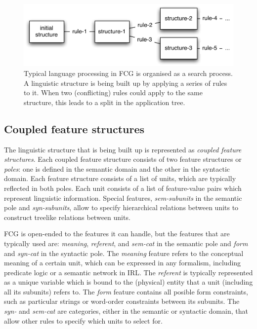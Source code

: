 \begin{figure}
  \begin{center}
    \includegraphics[width=.75\textwidth]{./frameworks/figures/fcg-search.pdf}
    \caption[Application of a rule-set]{Typical language processing in
      FCG is organised as a search process. A linguistic structure is
      being built up by applying a series of rules to it. When two
      (conflicting) rules could apply to the same structure, this
      leads to a split in the application tree.}
    \label{f:fcg-search}
  \end{center}
\end{figure}

\subsection{Coupled feature structures}
\label{s:coupled-feature-structures}

The linguistic structure that is being built up is represented as
\emph{coupled feature structures}. Each coupled feature structure
consists of two feature structures or \emph{poles}: one is defined in
the semantic domain and the other in the syntactic domain. Each
feature structure consists of a list of units, which are typically
reflected in both poles. Each unit consists of a list of feature-value
pairs which represent linguistic information. Special features,
\emph{sem-subunits} in the semantic pole and \emph{syn-subunits},
allow to specify hierarchical relations between units to construct
treelike relations between units.

FCG is open-ended to the features it can handle, but the features that
are typically used are: \emph{meaning}, \emph{referent}, and
\emph{sem-cat} in the semantic pole and \emph{form} and \emph{syn-cat}
in the syntactic pole. The \emph{meaning} feature refers to the
conceptual meaning of a certain unit, which can be expressed in any
formalism, including predicate logic or a semantic network in IRL. The
\emph{referent} is typically represented as a unique variable which is
bound to the (physical) entity that a unit (including all its
subunits) refers to. The \emph{form} feature contains all posible form
constraints, such as particular strings or word-order constraints
between its subunits. The \emph{syn-} and \emph{sem-cat} are
categories, either in the semantic or syntactic domain, that allow
other rules to specify which units to select for.

